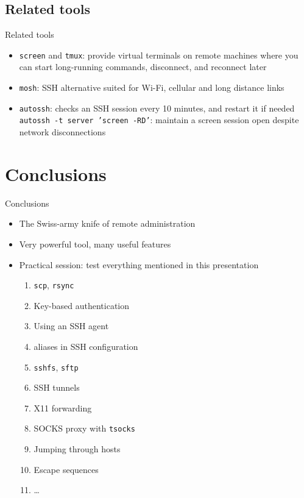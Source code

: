 \documentclass[11pt,final,usepdftitle=false]{beamer}
\begin{document}
\subsection{Related tools}
\begin{frame}{Related tools}
\begin{itemize}
\item \texttt{screen} and \texttt{tmux}: provide virtual terminals on remote
	machines where you can start long-running commands, disconnect, and
	reconnect later
	\hbr
\item \texttt{mosh}: SSH alternative suited for Wi-Fi, cellular and long distance links
	\hbr
\item \texttt{autossh}: checks an SSH session every 10 minutes, and restart it if needed\\
	\texttt{autossh -t server 'screen -RD'}: maintain a screen session open despite network disconnections
\end{itemize}
\end{frame}

\section{Conclusions}
\begin{frame}{Conclusions}
	\begin{itemize}
		\item The Swiss-army knife of remote administration
			\hbr
		\item Very powerful tool, many useful features
			\hbr
		\item Practical session: test everything mentioned in this presentation
			\begin{enumerate}
				\item \texttt{scp}, \texttt{rsync}
				\item Key-based authentication
				\item Using an SSH agent
				\item aliases in SSH configuration
				\item \texttt{sshfs}, \texttt{sftp}
				\item SSH tunnels
				\item X11 forwarding
				\item SOCKS proxy with \texttt{tsocks}
				\item Jumping through hosts
				\item Escape sequences
				\item \ldots
			\end{enumerate}
	\end{itemize}
\end{frame}
\end{document}
